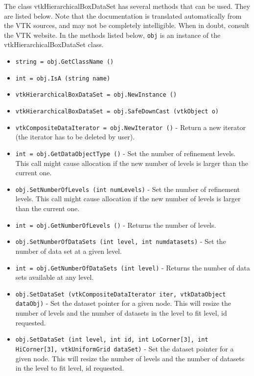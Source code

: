 The class vtkHierarchicalBoxDataSet has several methods that can be used.
  They are listed below.
Note that the documentation is translated automatically from the VTK sources,
and may not be completely intelligible.  When in doubt, consult the VTK website.
In the methods listed below, \verb|obj| is an instance of the vtkHierarchicalBoxDataSet class.
\begin{itemize}
\item  \verb|string = obj.GetClassName ()|

\item  \verb|int = obj.IsA (string name)|

\item  \verb|vtkHierarchicalBoxDataSet = obj.NewInstance ()|

\item  \verb|vtkHierarchicalBoxDataSet = obj.SafeDownCast (vtkObject o)|

\item  \verb|vtkCompositeDataIterator = obj.NewIterator ()| -  Return a new iterator (the iterator has to be deleted by user).

\item  \verb|int = obj.GetDataObjectType ()| -  Set the number of refinement levels. This call might cause
 allocation if the new number of levels is larger than the
 current one.

\item  \verb|obj.SetNumberOfLevels (int numLevels)| -  Set the number of refinement levels. This call might cause
 allocation if the new number of levels is larger than the
 current one.

\item  \verb|int = obj.GetNumberOfLevels ()| -  Returns the number of levels.

\item  \verb|obj.SetNumberOfDataSets (int level, int numdatasets)| -  Set the number of data set at a given level.

\item  \verb|int = obj.GetNumberOfDataSets (int level)| -  Returns the number of data sets available at any level.

\item  \verb|obj.SetDataSet (vtkCompositeDataIterator iter, vtkDataObject dataObj)| -  Set the dataset pointer for a given node. This will resize the number of
 levels and the number of datasets in the level to fit level, id requested. 

\item  \verb|obj.SetDataSet (int level, int id, int LoCorner[3], int HiCorner[3], vtkUniformGrid dataSet)| -  Set the dataset pointer for a given node. This will resize the number of
 levels and the number of datasets in the level to fit level, id requested. 


\end{itemize}

